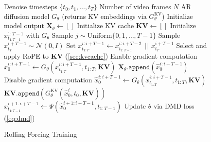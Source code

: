 
\begin{figure}
\vspace{-2em}
\begin{minipage}[t]{0.48\textwidth}
  \begin{algorithm}[H]
    \caption{Rolling Forcing Training}
    \small
    \begin{algorithmic}[1]
      \Require Denoise timesteps $\{t_0, t_1, \dots, t_T\}$
      \Require Number of video frames $N$
      \Require AR diffusion model $G_\theta$ (returns KV embeddings via $G_\theta^{\mathrm{KV}}$)
      \Loop
        \State Initialize model output $\mathbf{X}_{\theta} \gets []$
        \State Initialize KV cache $\mathbf{KV} \gets []$
        \State Initialize $x^{1:T-1}_{t_{1:T-1}}$ with $G_\theta$
        \State Sample $j \sim \text{Uniform}\{0, 1, \ldots, T-1\}$
          \State Sample $x_{t_T}^{i+T-1} \sim \mathcal{N}(0, I)$
          \State Set $x^{i:i+T-1}_{t_{1:T}} \gets x^{i:i+T-2}_{t_{1:T-1}} \,\|\, x_{t_T}^{i+T-1}  $
          \State Select and apply RoPE to $\mathbf{KV}$ (\cref{sec:kvcache})
            \State Enable gradient computation
            \State $\hat{x}^{i:i+T-1}_0 \gets G_\theta(x^{i:i+T-1}_{t_{1:T}}, t_{1:T},  \mathbf{KV})$
            \State $\mathbf{X}_{\theta}{\texttt{.append}}( \hat{x}^{i:i+T-1}_0)$
            \State Disable gradient computation
          \Else 
            \State $\hat{x}^{i:i+T-1}_0 \gets G_\theta(x^{i:i+T-1}_{t_{1:T}}, t_{1:T},  \mathbf{KV})$
          \EndIf
          \State $\mathbf{KV}{\texttt{.append}}( G_\theta^\text{KV}(\hat{x}^i_{0}, t_0, \mathbf{KV}))$
          \State $x^{i+1:i+T-1}_{t_{1:T-1}} \gets \Psi(\hat{x}^{i+1:i+T-1}_0, t_{1:T-1}) $
        \EndFor
        \State Update $\theta$ via DMD loss (\cref{eq:dmd})
      \EndLoop
    \end{algorithmic}
    \label{alg:training}
  \end{algorithm}
\end{minipage}
\vspace{-2em}
\end{figure}





